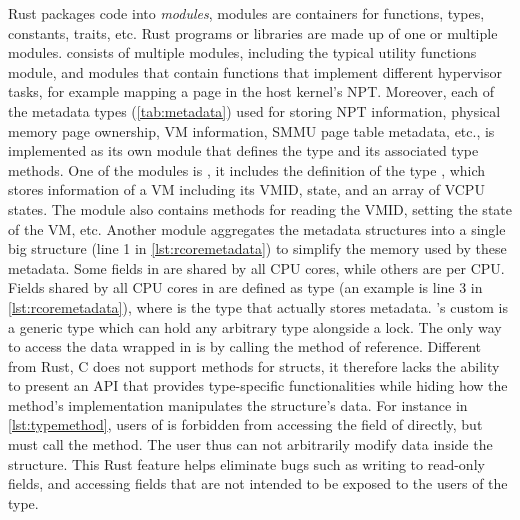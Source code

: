Rust packages code into \textit{modules}, modules are containers for functions,
types, constants, traits, etc. Rust programs or libraries are made up of one or
multiple modules.
\rustcore{} consists of multiple modules, including the typical utility
functions module, and modules that contain functions that implement different
hypervisor tasks, for example mapping a page in the host kernel's NPT.
Moreover, each of the \rustcore{} metadata types (\autoref{tab:metadata}) used
for storing NPT information, physical memory page ownership, VM information,
SMMU page table metadata, etc., is implemented as its own module that defines
the type and its associated type methods.
One of the modules is , it includes the definition of the type
, which stores information of a VM including its VMID, state, and
an array of VCPU states. The module also contains methods for reading the VMID,
setting the state of the VM, etc.
Another module aggregates the \rustcore{} metadata structures into a single big
structure  (line 1 in \autoref{lst:rcoremetadata}) to simplify
the memory used by these metadata.
Some fields in  are shared by all CPU cores, while others are per CPU.
Fields shared by all CPU cores in  are defined as type 
(an example is line 3 in \autoref{lst:rcoremetadata}),
where  is the type that actually stores \rustcore{} metadata.
\rustcore{}'s custom \code{\lock{}} is a generic type which can hold any
arbitrary type alongside a lock.
The only way to access the data wrapped in \code{\lock{}} is by calling the
 method of \code{\lock{}} reference.
Different from Rust, C does not support methods for structs, it therefore lacks
the ability to present an API that provides type-specific functionalities while
hiding how the method's implementation manipulates the structure's data.
For instance in \autoref{lst:typemethod}, users of  is forbidden
from accessing the  field of  directly, but must call
the  method. The user thus can not arbitrarily modify data
inside the structure. This Rust feature helps eliminate bugs such as writing to
read-only fields, and accessing fields that are not intended to be exposed to
the users of the type.

